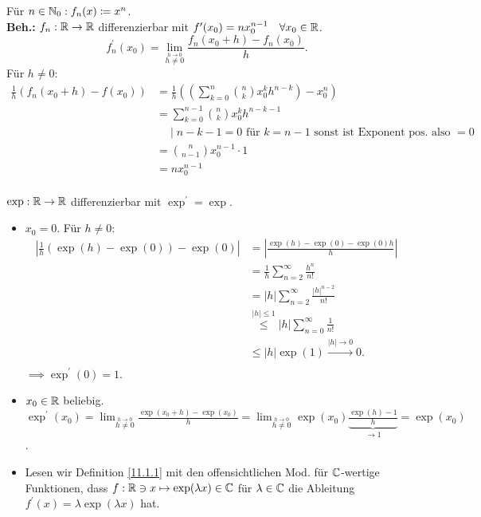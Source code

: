 \begin{subexample}
	Für $ n \in \mathbb{N}_0 : f_n(x) \coloneqq x^n $.\\
	\textbf{Beh.:} $ f_n : \mathbb{R} \to \mathbb{R}  $ differenzierbar mit $ f^\prime(x_0) = n x_0^{n-1} \quad \forall x_0 \in \mathbb{R}  $.
	\[
		f_n^{\prime} (x_0) = \lim_{\overset{h\to 0}{h\neq 0}} \frac{ f_n(x_0 + h) - f_n(x_0) }{ h } .
	\]
	Für $ h \neq 0 $:
	\begin{align*}
		\frac{ 1 }{ h } \left( f_n (x_0 + h) - f(x_0) \right) &= \frac{ 1 }{ h } \left( \left( \sum_{k=0}^{n} \binom{n}{k} x_0^kh^{n-k}  \right) - x_0^n \right) \\
		~&= \sum_{k=0}^{n-1} \binom{n}{k} x_0^kh^{n-k-1} \\
		~&\quad \mid n-k-1 = 0 \text{ für } k = n - 1 \text{ sonst ist Exponent pos. also } = 0\\
		~&= \binom{n}{n-1} x_0^{n-1} \cdot 1 \\
		~&= n x_0^{n-1}  \\
	\end{align*}
\end{subexample}

\begin{subexample}
	$ \exp : \mathbb{R} \to \mathbb{R}  $ differenzierbar mit $ \exp^\prime = \exp  $.
	\begin{itemize}
		\item $ x_0 = 0 $. Für $ h \neq 0 $:
			\begin{align*}
				\left| \frac{ 1 }{ h } \left( \exp (h) - \exp (0) \right) - \exp (0) \right| &= \left| \frac{ \exp (h) - \exp (0) - \exp (0)h }{ h }  \right|  \\
				~&= \frac{ 1 }{ h } \sum_{n=2}^{\infty} \frac{ h^n }{ n! }  \\
				~&= \left| h \right| \sum_{n=2}^{\infty} \frac{ \left| h \right|^{n-2} }{ n! }  \\
				~&\overset{\left| h \right| \leq 1}{\leq } \left| h \right| \sum_{n=0}^{\infty} \frac{ 1 }{ n! }  \\
				~&\leq \left| h \right| \exp (1) \overset{\left| h \right| \to 0}{\to } 0. \\
			\end{align*}
			$ \implies \exp^\prime (0) = 1 $.
		\item $ x_0 \in \mathbb{R}  $ beliebig. $ \exp^\prime (x_0) = \lim_{\overset{h \to 0}{h \neq 0}} \frac{ \exp (x_0 + h) - \exp (x_0) }{ h } = \lim_{\overset{h\to 0}{h\neq 0}} \exp (x_0) \underbrace{\frac{ \exp (h) - 1}{ h }}_{\to 1} = \exp (x_0)  $.
		\item Lesen wir Definition \ref{11.1.1} mit den offensichtlichen Mod. für $ \mathbb{C}  $-wertige Funktionen, dass $ f: \mathbb{R} \ni x \mapsto \exp (\lambda x) \in \mathbb{C}  $ für $ \lambda \in \mathbb{C}  $ die Ableitung $ f^\prime(x) = \lambda \exp (\lambda x) $ hat.
	\end{itemize}
\end{subexample}

